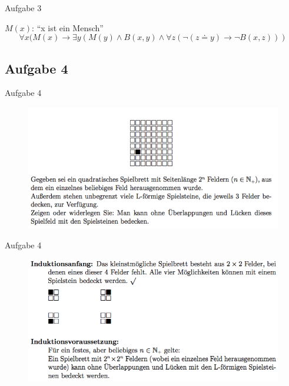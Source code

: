 \begin{frame}{Aufgabe 3}
\begin{figure}[h!]
	\end{figure}    
		$M(x)$: \enquote{x ist ein Mensch} \\[1em]
		\[ \forall x (M(x) \rightarrow \exists y (M(y) \wedge B(x,y) \wedge \forall z (\neg (z \doteq y) \rightarrow \neg B(x,z))) \]
\end{frame}

\subsection{Aufgabe 4}
\begin{frame}{Aufgabe 4}
\begin{figure}[h!]
		\centering
		\includegraphics[width=\textwidth]{../topics/weihnachtstut-aufgaben/8.png} 
	\end{figure}     
\end{frame}

\begin{frame}{Aufgabe 4}
\begin{figure}[h!]
		\centering
		\includegraphics[width=\textwidth]{../topics/weihnachtstut-aufgaben/9.png} 
	\end{figure}    
\end{frame}

